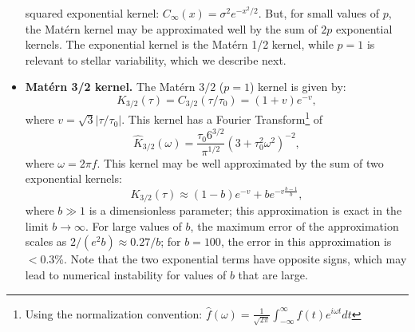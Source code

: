 \documentclass[manuscript, letterpaper]{aastex6}
\begin{document}
\begin{itemize}
squared exponential kernel: $C_\infty(x) = \sigma^2 e^{-x^2/2}$.  But, for small
values of $p$, the Mat\'ern kernel may be approximated well by the sum of
$2p$ exponential kernels.  The exponential kernel is the Mat\'ern 1/2 kernel, while
$p=1$ is relevant to stellar variability, which we describe next.
\item {\bf Mat\'ern 3/2 kernel.}  The Mat\'ern $3/2$ ($p=1$) kernel is given by: 
\begin{equation}
K_{3/2}(\tau) = C_{3/2}(\tau/\tau_0) = (1+v)e^{-v},
\end{equation} 
where $v = \sqrt{3}\vert \tau/\tau_0\vert$.  This kernel has a Fourier Transform\footnote{Using the normalization convention: 
$\hat f(\omega) = \frac{1}{\sqrt{2\pi}} \int_{-\infty}^\infty f(t) e^{i\omega t} dt$}  of
\begin{equation}
\hat K_{3/2}(\omega) = \frac{\tau_0 6^{3/2}}{\pi^{1/2}} (3+\tau_0^2\omega^2)^{-2},
\end{equation}
where $\omega = 2\pi f$.  This kernel may be well approximated by the sum of two exponential kernels: 
\begin{equation}
K_{3/2}(\tau) \approx (1-b)e^{-v}+be^{-v\frac{b-1}{b}},
\end{equation} 
where $b \gg 1$ is a dimensionless parameter; this approximation is exact in the limit $b \rightarrow \infty$.  For
large values of $b$, the maximum error of the approximation scales as $2/(e^2b) \approx 0.27/b$; for
$b=100$, the error in this approximation is $<0.3$\%.  Note that the two exponential terms
have opposite signs, which may lead to numerical instability for values of $b$ that
are large.  


\end{itemize}
\end{document}
